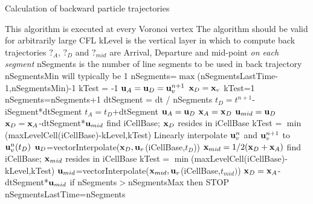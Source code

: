\documentclass[11pt]{report}
\begin{document}
\begin{algorithm}[ht]
  \caption{Calculation of backward particle trajectories}
  \label{alg:back_trajectories}
  \begin{algorithmic}[1]
    \State This algorithm is executed at every Voronoi vertex
    \State The algorithm should be valid for arbitrarily large CFL
    \State kLevel is the vertical layer in which to compute back trajectories
    \State $?_A$, $?_D$ and $?_{mid}$ are Arrival, Departure and mid-point {\it on each segment}
    \State nSegments is the number of line segments to be used in back trajectory
    \State nSegmentsMin will typically be 1
    \State nSegments=$\max$(nSegmentsLastTime-1,nSegmentsMin)-1
    \State kTest = -1 
    \State ${\bf u}_A= {\bf u}_D={\bf u}^{n+1}_v$  
    \State ${\bf x}_D= {\bf x}_v$  
      \State kTest=1  
      \State nSegments=nSegments+1
      \State dtSegment = dt / nSegments
       
      \State $t_D=t^{n+1}$-iSegment*dtSegment
      \State $t_A=t_D$+dtSegment
      \State ${\bf u}_A= {\bf u}_D$  
      \State ${\bf x}_A= {\bf x}_D$  
      \State ${\bf u}_{mid}= {\bf u}_D $ 
       
      \State ${\bf x}_{D}={\bf x}_A$-dtSegment*${\bf u}_{mid}$
      \State find iCellBase; ${\bf x}_{D}$ resides in iCellBase
      \State kTest = $\min$(maxLevelCell(iCellBase)-kLevel,kTest)
      \State Linearly interpolate ${\bf u}^n_v$ and ${\bf u}^{n+1}_v$ to ${\bf u}^n_v(t_D)$
      \State ${\bf u}_D$=vectorInterpolate(${\bf x}_{D},{\bf u}_v$(iCellBase,$t_D$))
      \State ${\bf x}_{mid}=1/2({\bf x}_{D}+{\bf x}_{A})$
      \State find iCellBase; ${\bf x}_{mid}$ resides in iCellBase
      \State kTest = $\min$(maxLevelCell(iCellBase)-kLevel,kTest)
      \State ${\bf u}_{mid}$=vectorInterpolate(${\bf x}_{mid},{\bf u}_v$(iCellBase,$t_{mid})$)
      \EndFor  {}
      \State ${\bf x}_{D} = {\bf x}_{A}$-dtSegment*${\bf u}_{mid}$
      \EndFor  {}
      \State if nSegments$>$nSegmentsMax then STOP
      \EndFor  {}
      \State nSegmentsLastTime=nSegments
  \end{algorithmic}
\end{algorithm}
\end{document}
